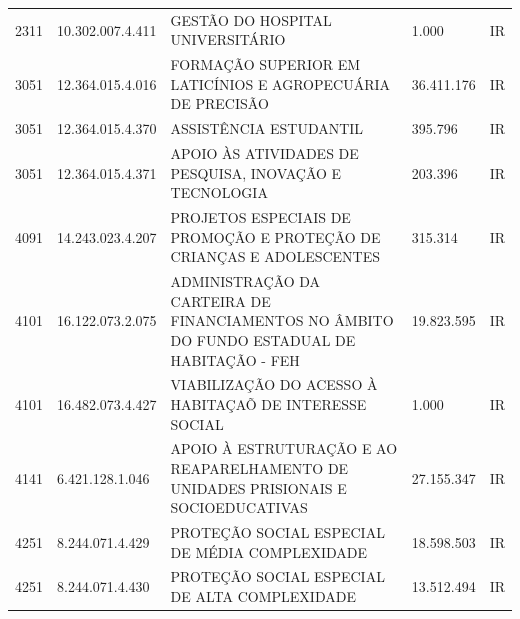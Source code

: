 \documentclass{article}
\begin{document}
\begin{longtable}[c]{m{1cm}|m{2cm}|m{10cm}|m{2cm}|m{1cm}}
\multicolumn{1}{C{1cm}|}{2311} & \multicolumn{1}{C{2cm}|}{10.302.007.4.411} & \multicolumn{1}{L{10cm}|}{GESTÃO DO HOSPITAL UNIVERSITÁRIO} & \multicolumn{1}{R{2cm}|}{1.000} & \multicolumn{1}{C{1cm}}{IR} \\
\multicolumn{1}{C{1cm}|}{3051} & \multicolumn{1}{C{2cm}|}{12.364.015.4.016} & \multicolumn{1}{L{10cm}|}{FORMAÇÃO SUPERIOR EM LATICÍNIOS E AGROPECUÁRIA DE PRECISÃO} & \multicolumn{1}{R{2cm}|}{36.411.176} & \multicolumn{1}{C{1cm}}{IR} \\
\multicolumn{1}{C{1cm}|}{3051} & \multicolumn{1}{C{2cm}|}{12.364.015.4.370} & \multicolumn{1}{L{10cm}|}{ASSISTÊNCIA ESTUDANTIL} & \multicolumn{1}{R{2cm}|}{395.796} & \multicolumn{1}{C{1cm}}{IR} \\
\multicolumn{1}{C{1cm}|}{3051} & \multicolumn{1}{C{2cm}|}{12.364.015.4.371} & \multicolumn{1}{L{10cm}|}{APOIO ÀS ATIVIDADES DE PESQUISA, INOVAÇÃO E TECNOLOGIA} & \multicolumn{1}{R{2cm}|}{203.396} & \multicolumn{1}{C{1cm}}{IR} \\
\multicolumn{1}{C{1cm}|}{4091} & \multicolumn{1}{C{2cm}|}{14.243.023.4.207} & \multicolumn{1}{L{10cm}|}{PROJETOS ESPECIAIS DE PROMOÇÃO E PROTEÇÃO DE CRIANÇAS E ADOLESCENTES} & \multicolumn{1}{R{2cm}|}{315.314} & \multicolumn{1}{C{1cm}}{IR} \\
\multicolumn{1}{C{1cm}|}{4101} & \multicolumn{1}{C{2cm}|}{16.122.073.2.075} & \multicolumn{1}{L{10cm}|}{ADMINISTRAÇÃO DA CARTEIRA DE FINANCIAMENTOS NO ÂMBITO DO FUNDO ESTADUAL DE HABITAÇÃO - FEH} & \multicolumn{1}{R{2cm}|}{19.823.595} & \multicolumn{1}{C{1cm}}{IR} \\
\multicolumn{1}{C{1cm}|}{4101} & \multicolumn{1}{C{2cm}|}{16.482.073.4.427} & \multicolumn{1}{L{10cm}|}{VIABILIZAÇÃO DO ACESSO À HABITAÇAÕ DE INTERESSE SOCIAL} & \multicolumn{1}{R{2cm}|}{1.000} & \multicolumn{1}{C{1cm}}{IR} \\
\multicolumn{1}{C{1cm}|}{4141} & \multicolumn{1}{C{2cm}|}{6.421.128.1.046} & \multicolumn{1}{L{10cm}|}{APOIO À ESTRUTURAÇÃO E AO REAPARELHAMENTO DE UNIDADES PRISIONAIS E SOCIOEDUCATIVAS} & \multicolumn{1}{R{2cm}|}{27.155.347} & \multicolumn{1}{C{1cm}}{IR} \\
\multicolumn{1}{C{1cm}|}{4251} & \multicolumn{1}{C{2cm}|}{8.244.071.4.429} & \multicolumn{1}{L{10cm}|}{PROTEÇÃO SOCIAL ESPECIAL DE MÉDIA COMPLEXIDADE} & \multicolumn{1}{R{2cm}|}{18.598.503} & \multicolumn{1}{C{1cm}}{IR} \\
\multicolumn{1}{C{1cm}|}{4251} & \multicolumn{1}{C{2cm}|}{8.244.071.4.430} & \multicolumn{1}{L{10cm}|}{PROTEÇÃO SOCIAL ESPECIAL DE ALTA COMPLEXIDADE} & \multicolumn{1}{R{2cm}|}{13.512.494} & \multicolumn{1}{C{1cm}}{IR} \\

\end{longtable}
\end{document}
